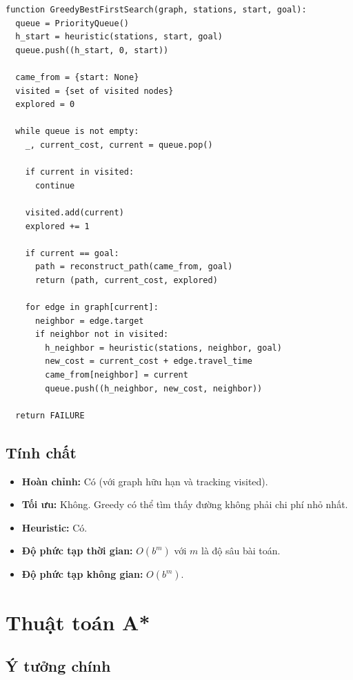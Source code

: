 \begin{lstlisting}[caption=Greedy Best-First Search Pseudocode]
function GreedyBestFirstSearch(graph, stations, start, goal):
  queue = PriorityQueue()
  h_start = heuristic(stations, start, goal)
  queue.push((h_start, 0, start))

  came_from = {start: None}
  visited = {set of visited nodes}
  explored = 0

  while queue is not empty:
    _, current_cost, current = queue.pop()

    if current in visited:
      continue

    visited.add(current)
    explored += 1

    if current == goal:
      path = reconstruct_path(came_from, goal)
      return (path, current_cost, explored)

    for edge in graph[current]:
      neighbor = edge.target
      if neighbor not in visited:
        h_neighbor = heuristic(stations, neighbor, goal)
        new_cost = current_cost + edge.travel_time
        came_from[neighbor] = current
        queue.push((h_neighbor, new_cost, neighbor))

  return FAILURE
\end{lstlisting}

\subsection{Tính chất}

\begin{itemize}
  \item \textbf{Hoàn chỉnh:} Có (với graph hữu hạn và tracking visited).
  \item \textbf{Tối ưu:} Không. Greedy có thể tìm thấy đường không phải chi phí nhỏ nhất.
  \item \textbf{Heuristic:} Có.
  \item \textbf{Độ phức tạp thời gian:} $O(b^m)$ với $m$ là độ sâu bài toán.
  \item \textbf{Độ phức tạp không gian:} $O(b^m)$.
\end{itemize}

\section{Thuật toán A*}

\subsection{Ý tưởng chính}

